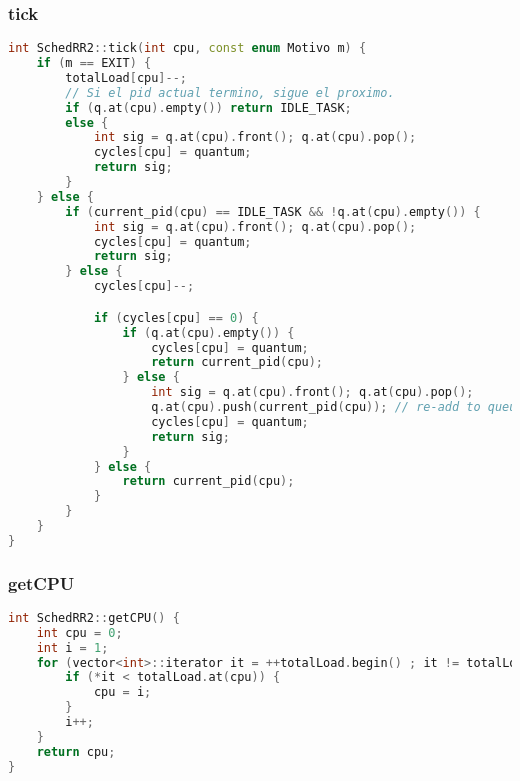 \subsubsection{tick}
\begin{lstlisting}[language=C++, breaklines=true]
int SchedRR2::tick(int cpu, const enum Motivo m) {
	if (m == EXIT) {
		totalLoad[cpu]--;
		// Si el pid actual termino, sigue el proximo.
		if (q.at(cpu).empty()) return IDLE_TASK;
		else {
			int sig = q.at(cpu).front(); q.at(cpu).pop();
			cycles[cpu] = quantum;
			return sig;
		}
	} else {
		if (current_pid(cpu) == IDLE_TASK && !q.at(cpu).empty()) {
			int sig = q.at(cpu).front(); q.at(cpu).pop();
			cycles[cpu] = quantum;
			return sig;
		} else {
			cycles[cpu]--;

			if (cycles[cpu] == 0) {
				if (q.at(cpu).empty()) {
					cycles[cpu] = quantum;
					return current_pid(cpu);
				} else {
					int sig = q.at(cpu).front(); q.at(cpu).pop();
					q.at(cpu).push(current_pid(cpu)); // re-add to queue
					cycles[cpu] = quantum;
					return sig;
				}
			} else {
				return current_pid(cpu);
			}
		}
	}
}
\end{lstlisting}

\subsubsection{getCPU}
\begin{lstlisting}[language=C++, breaklines=true]
int SchedRR2::getCPU() {
	int cpu = 0;
	int i = 1;
	for (vector<int>::iterator it = ++totalLoad.begin() ; it != totalLoad.end(); ++it) {
		if (*it < totalLoad.at(cpu)) {
			cpu = i;
		}
		i++;
	}
	return cpu;
}
\end{lstlisting}